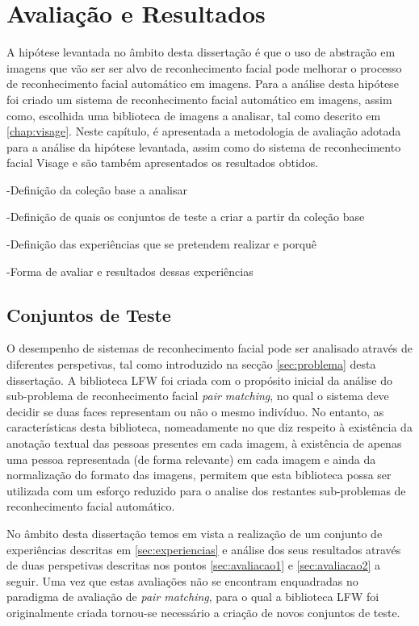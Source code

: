 \chapter{Avaliação e Resultados} \label{chap:resultados}

A hipótese levantada no âmbito desta dissertação é que o uso de abstração em imagens que vão ser ser alvo de reconhecimento facial pode melhorar o processo de reconhecimento facial automático em imagens. Para a análise desta hipótese foi criado um sistema de reconhecimento facial automático em imagens, assim  como, escolhida uma biblioteca de imagens a analisar, tal como descrito em \ref{chap:visage}. Neste capítulo, é apresentada a metodologia de avaliação adotada para a análise da hipótese levantada, assim como do sistema de reconhecimento facial Visage e são também apresentados os resultados obtidos.



-Definição da coleção base a analisar

-Definição de quais os conjuntos de teste a criar a partir da coleção base

-Definição das experiências que se pretendem realizar e porquê

-Forma de avaliar e resultados dessas experiências


\section{Conjuntos de Teste}  \label{sec:conjuntos}
O desempenho de sistemas de reconhecimento facial pode ser analisado através de diferentes perspetivas, tal como introduzido na secção \ref{sec:problema} desta dissertação. A biblioteca LFW foi criada com o propósito inicial da análise do sub-problema de reconhecimento facial \textit{pair matching}, no qual o sistema deve decidir se duas faces representam ou não o mesmo indivíduo. No entanto, as características desta biblioteca, nomeadamente no que diz respeito à existência da anotação textual das pessoas presentes em cada imagem, à existência de apenas uma pessoa representada (de forma relevante) em cada imagem e ainda da normalização do formato das imagens, permitem que esta biblioteca possa ser utilizada com um esforço reduzido para o analise dos restantes sub-problemas de reconhecimento facial automático.

No âmbito desta dissertação temos em vista a realização de um conjunto de experiências descritas em \ref{sec:experiencias} e análise dos seus resultados através de duas perspetivas descritas nos pontos \ref{sec:avaliacao1} e \ref{sec:avaliacao2} a seguir. Uma vez que estas avaliações não se encontram enquadradas no paradigma de avaliação de \textit{pair matching}, para o qual a biblioteca LFW foi originalmente criada tornou-se necessário a criação de novos conjuntos de teste.

